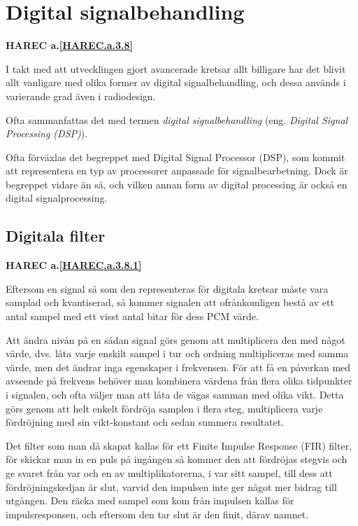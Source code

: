 \section{Digital signalbehandling}
\textbf{HAREC a.\ref{HAREC.a.3.8}\label{myHAREC.a.3.8}}

I takt med att utvecklingen gjort avancerade kretsar allt billigare har det
blivit allt vanligare med olika former av digital signalbehandling, och dessa
används i varierande grad även i radiodesign.

Ofta sammanfattas det med termen \emph{digital signalbehandling} (eng.
\emph{Digital Signal Processing (DSP)}).

Ofta förväxlas det begreppet med Digital Signal Processor (DSP), som kommit att
representera en typ av processorer anpassade för signalbearbetning.
Dock är begreppet vidare än så, och vilken annan form av digital processing är
också en digital signalprocessing.

\subsection{Digitala filter}
\textbf{HAREC a.\ref{HAREC.a.3.8.1}\label{myHAREC.a.3.8.1}}
\label{digitala filter}

Eftersom en signal så som den representeras för digitala kretsar måste vara
samplad och kvantiserad, så kommer signalen att ofrånkomligen bestå av ett
antal sampel med ett visst antal bitar för dess PCM värde.

Att ändra nivån på en sådan signal görs genom att multiplicera den med något
värde, dvs. låta varje enskilt sampel i tur och ordning multipliceras med
samma värde, men det ändrar inga egenskaper i frekvensen.
För att få en påverkan med avseende på frekvens behöver man kombinera värdena
från flera olika tidpunkter i signalen, och ofta väljer man att låta de
vägas samman med olika vikt.
Detta görs genom att helt enkelt fördröja samplen i flera steg,
multiplicera varje fördröjning med sin vikt-konstant och sedan summera
resultatet.

Det filter som man då skapat kallas för ett Finite Impulse Response (FIR)
filter, för skickar man in en puls på ingången så kommer den att fördröjas
stegvis och ge svaret från var och en av multiplikatorerna, i var sitt sampel,
till dess att fördröjningskedjan är slut, varvid den impulsen inte ger något
mer bidrag till utgången.
Den räcka med sampel som kom från impulsen kallas för impulsresponsen, och
eftersom den tar slut är den finit, därav namnet.


